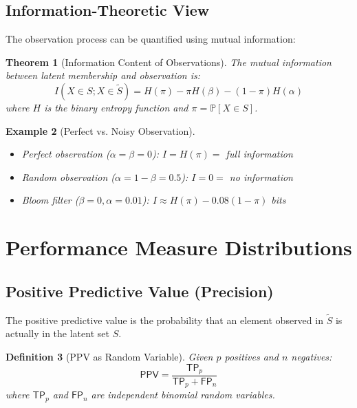 \documentclass[11pt,final,hidelinks]{article}
\newtheorem{theorem}{Theorem}[section]
\newtheorem{definition}[theorem]{Definition}
\newtheorem{example}[theorem]{Example}
\newcommand{\obs}[1]{\widetilde{#1}}  %
\newcommand{\Prob}[1]{\mathbb{P}\left[#1\right]}
\newcommand{\FP}{\mathsf{FP}}  %
\newcommand{\TP}{\mathsf{TP}}  %
\newcommand{\PPV}{\mathsf{PPV}}  %
\newcommand{\fprate}{\alpha}
\newcommand{\fnrate}{\beta}
\begin{document}
\subsection{Information-Theoretic View}

The observation process can be quantified using mutual information:

\begin{theorem}[Information Content of Observations]
The mutual information between latent membership and observation is:
\begin{equation}
I(X \in S; X \in \obs{S}) = H(\pi) - \pi H(\fnrate) - (1-\pi)H(\fprate)
\end{equation}
where $H$ is the binary entropy function and $\pi = \Prob{X \in S}$.
\end{theorem}

\begin{example}[Perfect vs. Noisy Observation]
\begin{itemize}
    \item Perfect observation ($\fprate = \fnrate = 0$): $I = H(\pi) = $ full information
    \item Random observation ($\fprate = 1-\fnrate = 0.5$): $I = 0 = $ no information
    \item Bloom filter ($\fnrate = 0, \fprate = 0.01$): $I \approx H(\pi) - 0.08(1-\pi)$ bits
\end{itemize}
\end{example}

\section{Performance Measure Distributions}

\subsection{Positive Predictive Value (Precision)}

The positive predictive value is the probability that an element observed in $\obs{S}$ is actually in the latent set $S$.

\begin{definition}[PPV as Random Variable]
Given $p$ positives and $n$ negatives:
\begin{equation}
\PPV = \frac{\TP_p}{\TP_p + \FP_n}
\end{equation}
where $\TP_p$ and $\FP_n$ are independent binomial random variables.
\end{definition}
\end{document}
